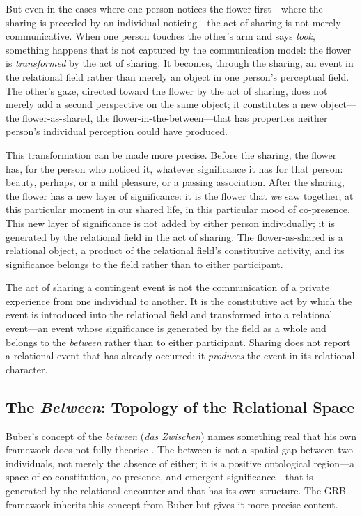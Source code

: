 But even in the cases where one person notices the flower first---where the sharing is preceded by an individual noticing---the act of sharing is not merely communicative. When one person touches the other's arm and says \emph{look}, something happens that is not captured by the communication model: the flower is \emph{transformed} by the act of sharing. It becomes, through the sharing, an event in the relational field rather than merely an object in one person's perceptual field. The other's gaze, directed toward the flower by the act of sharing, does not merely add a second perspective on the same object; it constitutes a new object---the flower-as-shared, the flower-in-the-between---that has properties neither person's individual perception could have produced.

This transformation can be made more precise. Before the sharing, the flower has, for the person who noticed it, whatever significance it has for that person: beauty, perhaps, or a mild pleasure, or a passing association. After the sharing, the flower has a new layer of significance: it is the flower that \emph{we} saw together, at this particular moment in our shared life, in this particular mood of co-presence. This new layer of significance is not added by either person individually; it is generated by the relational field in the act of sharing. The flower-as-shared is a relational object, a product of the relational field's constitutive activity, and its significance belongs to the field rather than to either participant.

\begin{claim}
The act of sharing a contingent event is not the communication of a private experience from one individual to another. It is the constitutive act by which the event is introduced into the relational field and transformed into a relational event---an event whose significance is generated by the field as a whole and belongs to the \emph{between} rather than to either participant. Sharing does not report a relational event that has already occurred; it \emph{produces} the event in its relational character.
\end{claim}

\subsection{The \emph{Between}: Topology of the Relational Space}
\label{p14:subsec:between}

\noindent
Buber's concept of the \emph{between} (\emph{das Zwischen}) names something real that his own framework does not fully theorise \parencite{buber1970}. The between is not a spatial gap between two individuals, not merely the absence of either; it is a positive ontological region---a space of co-constitution, co-presence, and emergent significance---that is generated by the relational encounter and that has its own structure. The GRB framework inherits this concept from Buber but gives it more precise content.

